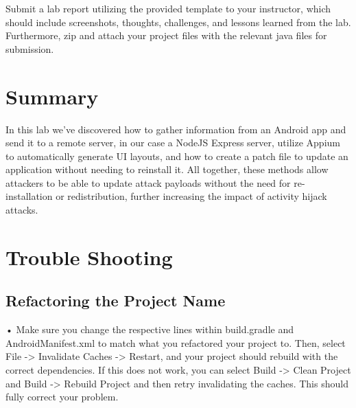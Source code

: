\documentclass[letterpaper,12pt]{report}
\begin{document}
Submit a lab report utilizing the provided template to your instructor, which should include screenshots, thoughts, challenges, and lessons learned from the lab. Furthermore, zip and attach your project files with the relevant java files for submission.


\section*{Summary}\label{sec:Summary}

In this lab we've discovered how to gather information from an Android app and send it to a remote server, in our case a NodeJS Express server, utilize Appium to automatically generate UI layouts, and how to create a patch file to update an application without needing to reinstall it. All together, these methods allow attackers to be able to update attack payloads without the need for re-installation or redistribution, further increasing the impact of activity hijack attacks.

\section*{Trouble Shooting}\label{sec:Trouble Shooting}

\subsection*{Refactoring the Project Name}\label{sec:Refactoring-the-Project-Name}

• Make sure you change the respective lines within build.gradle and AndroidManifest.xml to match what you refactored your project to. Then, select File -> Invalidate Caches -> Restart, and your project should rebuild with the correct dependencies. If this does not work, you can select Build -> Clean Project and Build -> Rebuild Project and then retry invalidating the caches. This should fully correct your problem.



\end{document}
